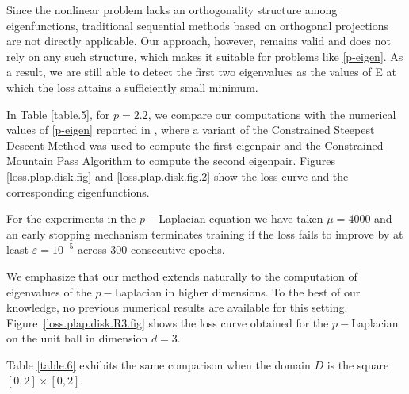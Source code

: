 \documentclass[11pt]{amsart}
\theoremstyle{definition}
\theoremstyle{remark}
\theoremstyle{plain}
\begin{document}
Since the nonlinear problem lacks an orthogonality structure among eigenfunctions, traditional sequential methods based on orthogonal projections are not directly applicable. Our approach, however, remains valid and does not rely on any such structure, which makes it suitable for problems like \eqref{p-eigen}. As a result, we are still able to detect the first two eigenvalues as the values of E at which the loss attains a sufficiently small minimum.


%
%
%


In Table \ref{table.5}, for $p=2.2$, we compare our computations with the numerical values of \eqref{p-eigen} reported in \cite{HJ11}, where a variant of the Constrained Steepest Descent Method was used to compute the first eigenpair and the Constrained Mountain Pass Algorithm to compute the second eigenpair.  Figures \ref{loss.plap.disk.fig} and \ref{loss.plap.disk.fig.2} show the loss curve and the corresponding eigenfunctions.


For the experiments in the $p-$Laplacian equation we have taken $\mu=4000$ and an early stopping mechanism terminates training if the loss fails to improve by at least $\varepsilon =10^{-5}$ across 300 consecutive epochs.

We emphasize that our method extends naturally to the computation of eigenvalues of the $p-$Laplacian in higher dimensions. To the best of our knowledge, no previous numerical results are available for this setting. Figure~\ref{loss.plap.disk.R3.fig} shows the loss curve obtained for the $p-$Laplacian on the unit ball in dimension $d=3$.


Table \ref{table.6} exhibits the same comparison when the domain $D$ is the square $[0,2]\times [0,2]$.
\end{document}
